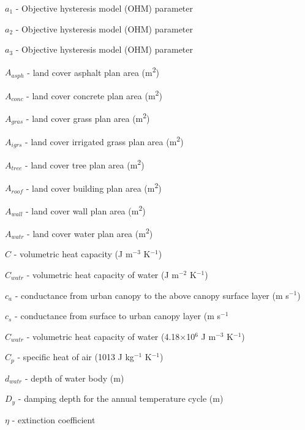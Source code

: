 

{\footnotesize
\begin{description} %


\item \ensuremath{a_{1}} - Objective hysteresis model (OHM) parameter
\item \ensuremath{a_{2}} - Objective hysteresis model (OHM) parameter
\item \ensuremath{a_{3}} - Objective hysteresis model (OHM) parameter
\item \ensuremath{A_{asph}} - land cover asphalt plan area (m\textsuperscript{2})
\item \ensuremath{A_{conc}} - land cover concrete plan area (m\textsuperscript{2})
\item \ensuremath{A_{gras}} - land cover grass plan area (m\textsuperscript{2})
\item \ensuremath{A_{igrs}} - land cover irrigated grass plan area (m\textsuperscript{2})
\item \ensuremath{A_{tree}} - land cover tree plan area (m\textsuperscript{2})
\item \ensuremath{A_{roof}} - land cover building plan area (m\textsuperscript{2})
\item \ensuremath{A_{wall}} - land cover wall plan area (m\textsuperscript{2})
\item \ensuremath{A_{watr}} - land cover water plan area (m\textsuperscript{2})
\item \ensuremath{C} - volumetric heat capacity (J m$^{-3}$ K$^{-1}$)
\item \ensuremath{C_{watr}} - volumetric heat capacity of water (J m$^{-2}$ K$^{-1}$)
\item \ensuremath{c_{a}} - conductance from urban canopy to the above canopy surface layer (m s$^{-1}$)
\item \ensuremath{c_{s}} - conductance from surface to urban canopy layer (m s$^{-1}$
\item \ensuremath{C_{watr}} - volumetric heat capacity of water (4.18$\times$10$^{6}$ J m$^{-3}$ K$^{-1}$)
\item \ensuremath{C_{p}} - specific heat of air (1013 J kg$^{-1}$ K$^{-1}$)
\item \ensuremath{d_{watr}} - depth of water body (m)
\item \ensuremath{D_{y}} - damping depth for the annual temperature cycle (m)
\item \ensuremath{\eta} - extinction coefficient

\end{description}}
